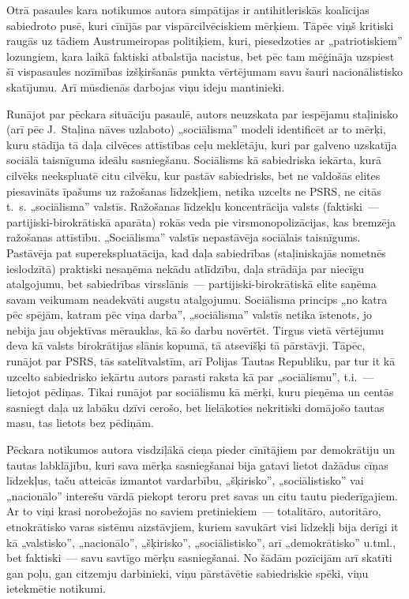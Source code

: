 \documentclass[twoside,a5paper,12pt,fleqn,openany]{extbook}
\begin{document}
Otrā pasaules kara notikumos autora simpātijas ir antihitleriskās koalīcijas sabiedroto pusē, kuri cīnījās par vispārcilvēciskiem mērķiem. Tāpēc viņš kritiski raugās uz tādiem Austrumeiropas politiķiem, kuri, piesedzoties ar „patriotiskiem” lozungiem, kara laikā faktiski atbalstīja nacistus, bet pēc tam mēģināja uzspiest šī vispasaules nozīmības izšķiršanās punkta vērtējumam savu šauri nacionālistisko skatījumu. Arī mūsdienās darbojas viņu ideju mantinieki.

Runājot par pēckara situāciju pasaulē, autors neuzskata par iespējamu staļinisko (arī pēc J.~Staļina nāves uzlaboto) „sociālisma” modeli identificēt ar to mērķi, kuru stādīja tā daļa cilvēces attīstības ceļu meklētāju, kuri par galveno uzskatīja sociālā taisnīguma ideālu sasniegšanu. Sociālisms kā sabiedriska iekārta, kurā cilvēks neekspluatē citu cilvēku, kur pastāv sabiedrisks, bet ne valdošās elites piesavināts īpašums uz ražošanas līdzekļiem, netika uzcelts ne PSRS, ne citās t.~s. „sociālisma” valstīs. Ražošanas līdzekļu koncentrācija valsts (faktiski~--- partijiski-birokrātiskā aparāta) rokās veda pie virsmonopolizācijas, kas bremzēja ražošanas attīstību. „Sociālisma” valstīs nepastāvēja sociālais taisnīgums. Pastāvēja pat superekspluatācija, kad daļa sabiedrības (staļiniskajās nometnēs ieslodzītā) praktiski nesaņēma nekādu atlīdzību, daļa strādāja par niecīgu atalgojumu, bet sabiedrības virsslānis~--- partijiski-birokrātiskā elite saņēma savam veikumam neadekvāti augstu atalgojumu. Sociālisma princips „no katra pēc spējām, katram pēc viņa darba”, „sociālisma” valstīs netika īstenots, jo nebija jau objektīvas mērauklas, kā šo darbu novērtēt. Tirgus vietā vērtējumu deva kā valsts birokrātijas slānis kopumā, tā atsevišķi tā pārstāvji. Tāpēc, runājot par PSRS, tās satelītvalstīm, arī Polijas Tautas Republiku, par tur it kā uzcelto sabiedrisko iekārtu autors parasti raksta kā par „sociālismu”, t.i.~--- lietojot pēdiņas. Tikai runājot par sociālismu kā mērķi, kuru pieņēma un centās sasniegt daļa uz labāku dzīvi cerošo, bet lielākoties nekritiski domājošo tautas masu, tas lietots bez pēdiņām.

Pēckara notikumos autora visdziļākā cieņa pieder cīnītājiem par demokrātiju un tautas labklājību, kuri sava mērķa sasniegšanai bija gatavi lietot dažādus cīņas līdzekļus, taču atteicās izmantot vardarbību, „šķirisko”, „sociālistisko” vai „nacionālo” interešu vārdā piekopt teroru pret savas un citu tautu piederīgajiem. Ar to viņi krasi norobežojās no saviem pretiniekiem~--- totalitāro, autoritāro, etnokrātisko varas sistēmu aizstāvjiem, kuriem savukārt visi līdzekļi bija derīgi it kā „valstisko”, „nacionālo”, „šķirisko”, „sociālistisko”, arī „demokrātisko” u.tml., bet faktiski~--- savu savtīgo mērķu sasniegšanai. No šādām pozīcijām arī skatīti gan poļu, gan citzemju darbinieki, viņu pārstāvētie sabiedriskie spēki, viņu ietekmētie notikumi.
\end{document}

